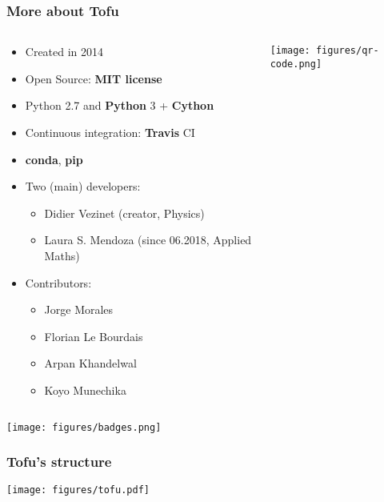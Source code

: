 \documentclass[10pt]{beamer}
\begin{document}
\begin{frame}
\frametitle{More about Tofu}

\begin{columns}
\begin{column}{0.65\textwidth}
\begin{itemize}
	\item Created in 2014
	\item Open Source:\textbf{ MIT license}
	\item Python 2.7 and \textbf{Python} 3 + \textbf{Cython}
	\item Continuous integration: \textbf{Travis} CI
	\item \textbf{conda}, \textbf{pip}
	\item Two (main) developers:
	\begin{itemize}
		\item Didier Vezinet (creator, Physics)
		\item Laura S. Mendoza (since 06.2018, Applied Maths)
	\end{itemize}
	\item Contributors:
	\begin{itemize}
		\item Jorge Morales
		\item Florian Le Bourdais
		\item Arpan Khandelwal
		\item Koyo Munechika
	\end{itemize}
\end{itemize}
\end{column}
\begin{column}{0.35\textwidth}
\begin{center}
    	\texttt{[image: figures/qr-code.png]}
\end{center}
\end{column}
\end{columns}
\begin{center}
    	\texttt{[image: figures/badges.png]}
\end{center}

\end{frame}

\begin{frame}
\frametitle{Tofu's structure}

\begin{center}
    	\texttt{[image: figures/tofu.pdf]}
\end{center}
	
\end{frame}
\end{document}
